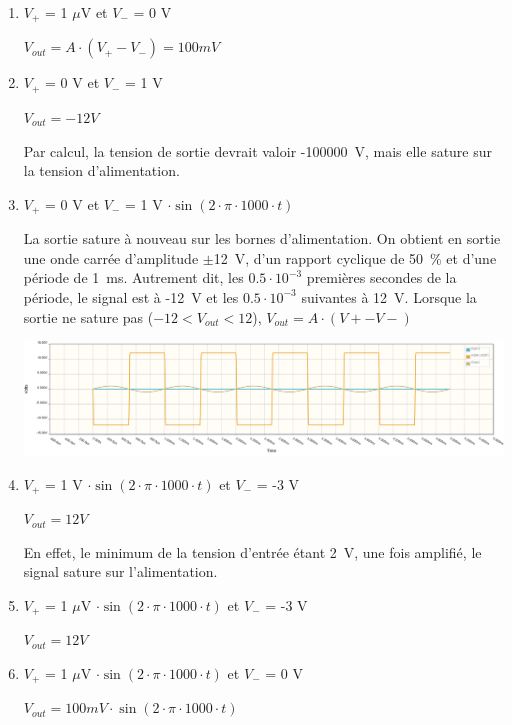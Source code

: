 \documentclass{../template/tp}
\begin{document}
{
	\begin{enumerate}[label=\alph*)]
		\item $V_+$ = 1 $\mu$V et $V_-$ = 0 V

			$V_{out} = A \cdot (V_+ - V_-) = 100 mV$

		\item $V_+$ = 0 V et $V_-$ = 1 V

			$V_{out} = -12 V$

			Par calcul, la tension de sortie devrait valoir -100000~V, mais elle sature sur la tension d'alimentation.

		\item $V_+$ = 0 V et $V_-$ = 1 V $\cdot \sin(2 \cdot \pi \cdot 1000 \cdot t)$

			La sortie sature à nouveau sur les bornes d'alimentation. On obtient en sortie une onde carrée d'amplitude $\pm$12~V, d'un rapport cyclique de 50~\% et d'une période de 1~ms. Autrement dit, les $0.5 \cdot 10^{-3}$ premières secondes de la période, le signal est à -12~V et les $0.5 \cdot 10^{-3}$ suivantes à 12~V. Lorsque la sortie ne sature pas ($-12<V_{out}<12$), $V_{out}=A\cdot\left(V+-V-\right)$

			\includegraphics[width=\textwidth]{AOP-diff-c.png}

		\item $V_+$ = 1 V $\cdot \sin(2 \cdot \pi \cdot 1000 \cdot t)$ et $V_-$ = -3 V

			$V_{out} = 12 V$

			En effet, le minimum de la tension d'entrée étant 2~V, une fois amplifié, le signal sature sur l'alimentation.

		\item $V_+$ = 1 $\mu$V $\cdot \sin(2 \cdot \pi \cdot 1000 \cdot t)$ et $V_-$ = -3 V

			$V_{out} = 12 V$

		\item $V_+$ = 1 $\mu$V $\cdot \sin(2 \cdot \pi \cdot 1000 \cdot t)$ et $V_-$ = 0 V

			$V_{out} = 100 mV \cdot \sin(2 \cdot \pi \cdot 1000 \cdot t)$
	\end{enumerate}
}
\end{document}
